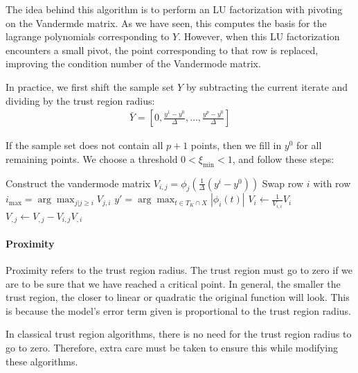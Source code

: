 The idea behind this algorithm is to perform an LU factorization with pivoting on the Vandermde matrix.
As we have seen, this computes the basis for the lagrange polynomials corresponding to $Y$.
However, when this LU factorization encounters a small pivot, the point corresponding to that row is replaced, improving the condition number of the Vandermode matrix.

In practice, we first shift the sample set $Y$ by subtracting the current iterate and dividing by the trust region radius:
\begin{align}
\bar{Y} = [0, \frac{y^1 - y^0}{\Delta}, \ldots, \frac{y^p - y^0}{\Delta}]
\end{align}

If the sample set does not contain all $p+1$ points, then we fill in $y^0$ for all remaining points.
We choose a threshold $0 < \xi_{\text{min}} < 1$, and follow these steps:

\begin{algorithmic}[1]
\State Construct the vandermode matrix $V_{i,j} = \phi_j(\frac 1 {\Delta}(y^i - y^0))$
    \State Swap row $i$ with row $i_{\max} = \arg \max_{j|j\ge i} V_{j,i} $
        \State \label{next_point} $y' = \arg\max_{t \in T_K \cap X} |\phi_i(t)|$
    \EndIf
    \State $V_i \gets \frac{1}{V_{i,i}} V_i$
        \State $V_{,j} \gets V_{, j} - V_{i,j} V_{, i}$
    \EndFor
\EndFor
\label{model_improving_algorithm}
\end{algorithmic}



\paragraph{Proximity}

Proximity refers to the trust region radius.
The trust region must go to zero if we are to be sure that we have reached a critical point.
In general, the smaller the trust region, the closer to linear or quadratic the original function will look.
This is because the model's error term given is proportional to the trust region radius.

In classical trust region algorithms, there is no need for the trust region radius to go to zero.
Therefore, extra care must be taken to ensure this while modifying these algorithms.

